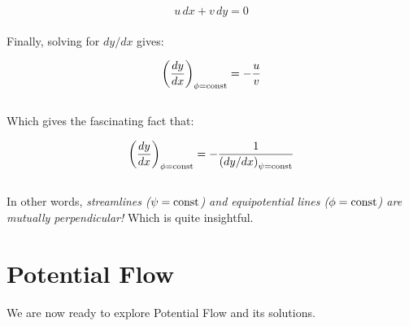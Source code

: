 \documentclass[11pt]{article}
\begin{document}
\begin{equation*}
    u\,dx + v\,dy = 0
\end{equation*}\\
\noindent
Finally, solving for $dy/dx$ gives:

\begin{equation*}
    \left( \frac{dy}{dx} \right)_{\phi = \textnormal{const}}=-\frac{u}{v}
\end{equation*}\\
Which gives the fascinating fact that:

\begin{equation*}
    \left( \frac{dy}{dx} \right)_{\phi = \textnormal{const}} = -\frac{1}{\left( dy/dx \right)_{\psi=\textnormal{const}}}
\end{equation*}\\
\noindent
In other words, \emph{streamlines ($\psi = \textnormal{const}$) and equipotential lines ($\phi = \textnormal{const}$) are mutually perpendicular!} Which is quite insightful.
\pagebreak

\section{Potential Flow}
We are now ready to explore Potential Flow and its solutions.
\end{document}
